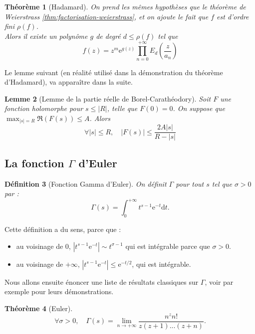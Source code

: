 \documentclass[french]{report}
\newtheorem{theorem}{Théorème}[section]
\newtheorem{definition}[theorem]{Définition}
\newtheorem{lemma}[theorem]{Lemme}
\begin{document}
\begin{theorem}[Hadamard]\label{thm:factorisation-hadamard}
  On prend les mêmes hypothèses que le théorème de Weierstrass \ref{thm:factorisation-weierstrass}, et on ajoute le fait que $f$ est d'ordre fini $\rho(f)$.
  \\
  Alors il existe un polynôme $g$ de degré $d\leq \rho(f)$ tel que
  \[
    f(z)=z^m\mathrm{e}^{g(z)}\prod_{n=0}^{+\infty}E_d\left(\frac{z}{a_n}\right)
  \]
\end{theorem}

Le lemme suivant (en réalité utilisé dans la démonstration du théorème d'Hadamard), va apparaître dans la suite.

\begin{lemma}[Lemme de la partie réelle de Borel-Carathéodory]\label{lem:borel-caratheodory}
  Soit $F$ une fonction holomorphe pour $s\leq|R|$, telle que $F(0)=0$. On suppose que $\max_{|s|=R}\Re(F(s))\leq A$. Alors
  \[
    \forall |s|\leq R,\quad|F(s)|\leq\frac{2A|s|}{R-|s|}  
  \]
\end{lemma}

\subsection{La fonction $\Gamma$ d'Euler}

\begin{definition}[Fonction Gamma d'Euler]
  On définit $\Gamma$ pour tout $s$ tel que $\sigma>0$ par :
  \[
    \Gamma(s)=\int_0^{+\infty}t^{s-1}\mathrm{e}^{-t}\mathrm{d}t.
  \]
\end{definition}

Cette définition a du sens, parce que :
\begin{itemize}
  \item au voisinage de 0, $|t^{s-1}\mathrm{e}^{-t}|\sim t^{\sigma-1}$ qui est intégrable parce que $\sigma>0$.
  \item au voisinage de $+\infty$, $|t^{s-1}\mathrm{e}^{-t}|\leq \mathrm{e}^{-t/2}$, qui est intégrable.
\end{itemize}

Nous allons ensuite énoncer une liste de résultats classiques sur $\Gamma$, voir par exemple \cite{tenenbaum} pour leurs démonstrations.

\begin{theorem}[Euler]
  \[
    \forall \sigma>0,\quad
    \Gamma(s)=\lim_{n\to+\infty}\frac{n^zn!}{z(z+1)...(z+n)}.  
  \]
\end{theorem}
\end{document}

